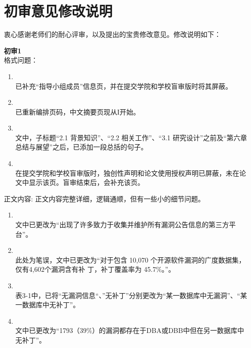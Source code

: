 \chapter{初审意见修改说明}

衷心感谢老师们的耐心评审，以及提出的宝贵修改意见。修改说明如下：

\textbf{初审1}\\
格式问题：
\begin{enumerate}[]
\item {}\\
  已补充“指导小组成员”信息页，并在提交学院和学校盲审版时将其屏蔽。
\item {}\\
  已重新编排页码，中文摘要页现从I开始。
\item {}\\
  文中，子标题“2.1 背景知识”、“2.2 相关工作”、“3.1 研究设计”之前及“第六章 总结与展望”之后，已添加一段总括的句子。
\item {}\\
  在提交学院和学校盲审版时，独创性声明和论文使用授权声明已屏蔽，未在论文中显示该页。盲审结束后，会补充该页。
\end{enumerate}

正文内容: 正文内容完整详细，逻辑通顺，但有一些小的细节问题。
\begin{enumerate}[]
    \item {}\\
      文中已更改为“出现了许多致力于收集并维护所有漏洞公告信息的第三方平台”。
    \item {}\\
      此处为笔误，文中已更改为“对于包含 10,070 个开源软件漏洞的广度数据集，仅有4,602个漏洞含有补 丁，补丁覆盖率为 45.7\%。”。
    \item {}\\
      表3-1中，已将“无漏洞信息“、”无补丁”分别更改为“某一数据库中无漏洞”、“某一数据库中无补丁”。
    \item {}\\
      文中已更改为“1793（39\%）的漏洞都存在于DBA或DBB中但在另一数据库中无补丁”。
\end{enumerate}

